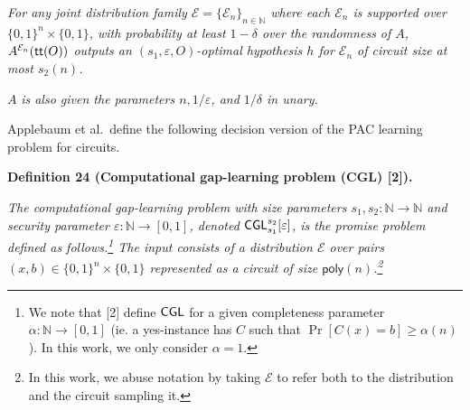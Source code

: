 \emph{For any joint distribution family $\mathcal{E}=\{\mathcal{E}_{n}\}_{n\in\mathbb{N}}$ where each $\mathcal{E}_{n}$ is supported over $\{0,1\}^{n}\times\{0,1\}$, with probability at least $1-\delta$ over the randomness of $A$, $A^{\mathcal{E}_{n}}({\sf tt}(O))$ outputs an $(s_{1},\varepsilon,O)$-optimal hypothesis $h$ for $\mathcal{E}_{n}$ of circuit size at most $s_{2}(n)$.}\par




$A$\emph{ is also given the parameters $n,1/\varepsilon$, and $1/\delta$ in unary.}\par






Applebaum et al. define the following decision version of the PAC learning problem for circuits.\par





\par\medskip\noindent\textbf{
\textbf{Definition 24}\textbf{ }(Computational gap-learning problem (CGL) [2])\textbf{.}
}\par



\emph{The computational gap-learning problem with size parameters $s_{1},s_{2}:\mathbb{N}\to\mathbb{N}$ and security parameter $\varepsilon:\mathbb{N}\to[0,1]$, denoted ${\sf CGL}_{s_{1}}^{s_{2}}[\varepsilon]$, is the promise problem defined as follows.\footnote{We note that [2] define ${\sf CGL}$ for a given completeness parameter $\alpha:\mathbb{N}\to[0,1]$ (ie. a yes-instance has $C$ such that $\Pr[C(x)=b]\geq\alpha(n)$). In this work, we only consider $\alpha=1$.} The input consists of a distribution $\mathcal{E}$ over pairs $(x,b)\in\{0,1\}^{n}\times\{0,1\}$ represented as a circuit of size ${\mathsf{poly}}(n)$.\footnote{In this work, we abuse notation by taking $\mathcal{E}$ to refer both to the distribution and the circuit sampling it.}}\par



